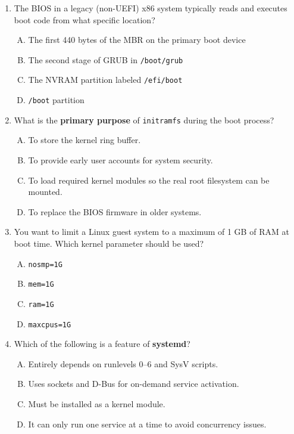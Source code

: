 \documentclass[a4paper]{report}
\begin{document}
\begin{enumerate}[1.]
    \item The BIOS in a legacy (non-UEFI) x86 system typically reads and executes boot code from what specific location?
      \begin{enumerate}[A)]
        \item The first 440 bytes of the MBR on the primary boot device
        \item The second stage of GRUB in \texttt{/boot/grub}
        \item The NVRAM partition labeled \texttt{/efi/boot}
        \item \texttt{/boot} partition
      \end{enumerate}
    
    \item What is the \textbf{primary purpose} of \texttt{initramfs} during the boot process?
      \begin{enumerate}[A)]
        \item To store the kernel ring buffer.
        \item To provide early user accounts for system security.
        \item To load required kernel modules so the real root filesystem can be mounted.
        \item To replace the BIOS firmware in older systems.
      \end{enumerate}
    
    \item You want to limit a Linux guest system to a maximum of 1 GB of RAM at boot time. Which kernel parameter should be used?
      \begin{enumerate}[A)]
        \item \texttt{nosmp=1G}
        \item \texttt{mem=1G}
        \item \texttt{ram=1G}
        \item \texttt{maxcpus=1G}
      \end{enumerate}
    
    \item Which of the following is a feature of \textbf{systemd}?
      \begin{enumerate}[A)]
        \item Entirely depends on runlevels 0–6 and SysV scripts.
        \item Uses sockets and D-Bus for on-demand service activation.
        \item Must be installed as a kernel module.
        \item It can only run one service at a time to avoid concurrency issues.
      \end{enumerate}
    

\end{enumerate}
\end{document}
